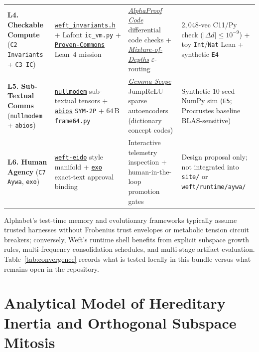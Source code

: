 \documentclass[10pt,a4paper]{article}
\begin{document}
\begin{table}[!htbp]
\begin{tabularx}{\linewidth}{@{}>{\raggedright\arraybackslash}p{30mm} >{\raggedright\arraybackslash}X >{\raggedright\arraybackslash}X >{\raggedright\arraybackslash}p{36mm}@{}}
\textbf{L4. Checkable Compute} (\texttt{C2 Invariants} + \texttt{C3 IC}) & \href{https://github.com/Moissanite-Labs/weft/blob/main/weft/runtime/invariants/weft_invariants.h}{\texttt{weft\_}\allowbreak\texttt{invariants.h}} + Lafont \texttt{ic\_vm.py} + \href{https://github.com/Proven-Commons/mission}{\texttt{Proven-Commons}} Lean~4 mission & \href{https://deepmind.google/blog/introducing-alphaproof-code/}{\emph{AlphaProof Code}} differential code checks + \href{https://arxiv.org/abs/2404.02258}{\emph{Mixture-of-Depths}} $\varepsilon$-routing & $2{,}048$-vec C11/Py check ($|\Delta d|\le 10^{-9}$) + toy \texttt{Int}/\texttt{Nat} Lean + synthetic \texttt{E4} \\
\addlinespace[2.5pt]
\textbf{L5. Sub-Textual Comms} (\texttt{nullmodem} + \texttt{abios}) & \href{https://github.com/Moissanite-Labs/nullmodem}{\texttt{nullmodem}} sub-textual tensors + \href{https://github.com/Moissanite-Labs/abios}{\texttt{abios}} \texttt{SYM-2P} + $64$\,B \texttt{frame64.py} & \href{https://arxiv.org/abs/2408.05147}{\emph{Gemma Scope}} JumpReLU sparse autoencoders (dictionary concept codes) & Synthetic 10-seed NumPy sim (\texttt{E5}; Procrustes baseline BLAS-sensitive) \\
\addlinespace[2.5pt]
\textbf{L6. Human Agency} (\texttt{C7 Aywa}, \texttt{exo}) & \href{https://github.com/Moissanite-Labs/weft-eido}{\texttt{weft-eido}} style manifold + \href{https://github.com/Moissanite-Labs/exo}{\texttt{exo}} exact-text approval binding & Interactive telemetry inspection + human-in-the-loop promotion gates & Design proposal only; not integrated into \texttt{site/} or \texttt{weft/runtime/aywa/} \\
\bottomrule
\end{tabularx}
\end{table}

Alphabet's test-time memory and evolutionary frameworks typically assume trusted harnesses without Frobenius trust envelopes or metabolic tension circuit breakers; conversely, Weft's runtime shell benefits from explicit subspace growth rules, multi-frequency consolidation schedules, and multi-stage artifact evaluation. Table~\ref{tab:convergence} records what is tested locally in this bundle versus what remains open in the repository.

\section{Analytical Model of Hereditary Inertia and Orthogonal Subspace Mitosis}
\end{document}
